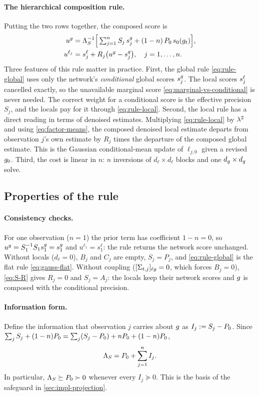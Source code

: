 \paragraph{The hierarchical composition rule.}
Putting the two rows together, the composed score is
\begin{align}
  u^{g}&=\Lambda_S^{-1}\Big[\textstyle\sum_{j=1}^{n}S_j\,s_j^{g}+(1-n)\,P_{0}\,s_0(g_t)\Big],\label{eq:rule-global}\\
  u^{\ell_j}&=s_j^{\ell}+R_j\big(u^{g}-s_j^{g}\big),\quad j=1,\dots,n.\label{eq:rule-local}
\end{align}
Three features of this rule matter in practice.
First, the global rule \cref{eq:rule-global} uses only the network's \emph{conditional} global scores $s_j^{g}$.
The local scores $s_j^{\ell}$ cancelled exactly, so the unavailable marginal score \cref{eq:marginal-vs-conditional} is never needed.
The correct weight for a conditional score is the effective precision $S_j$, and the locals pay for it through \cref{eq:rule-local}.
Second, the local rule has a direct reading in terms of denoised estimates.
Multiplying \cref{eq:rule-local} by $\lambda^2$ and using \cref{eq:factor-means}, the composed denoised local estimate departs from observation $j$'s own estimate by $R_j$ times the departure of the composed global estimate.
This is the Gaussian conditional-mean update of $\ell_{j,0}$ given a revised $g_0$.
Third, the cost is linear in $n$: $n$ inversions of $d_\ell\times d_\ell$ blocks and one $d_g\times d_g$ solve.

\subsection{Properties of the rule}\label{sec:properties}

\paragraph{Consistency checks.}
For one observation ($n=1$) the prior term has coefficient $1-n=0$, so $u^{g}=S_1^{-1}S_1s_1^g=s_1^g$ and $u^{\ell_1}=s_1^\ell$: the rule returns the network score unchanged.
Without locals ($d_\ell=0$), $B_j$ and $C_j$ are empty, $S_j=P_j$, and \cref{eq:rule-global} is the flat rule \cref{eq:gauss-flat}.
Without coupling ($[\Sigma_{t,j}]_{\ell g}=0$, which forces $B_j=0$), \cref{eq:S-R} gives $R_j=0$ and $S_j=A_j$: the locals keep their network scores and $g$ is composed with the conditional precision.

\paragraph{Information form.}
Define the information that observation $j$ carries about $g$ as $I_j:=S_j-P_{0}$.
Since $\sum_jS_j+(1-n)P_{0}=\sum_j(S_j-P_{0})+nP_{0}+(1-n)P_{0}$,
\begin{equation}\label{eq:information}
  \Lambda_S=P_{0}+\sum_{j=1}^nI_j .
\end{equation}
In particular, $\Lambda_S\succeq P_{0}\succ0$ whenever every $I_j\succeq0$.
This is the basis of the safeguard in \cref{sec:impl-projection}.

